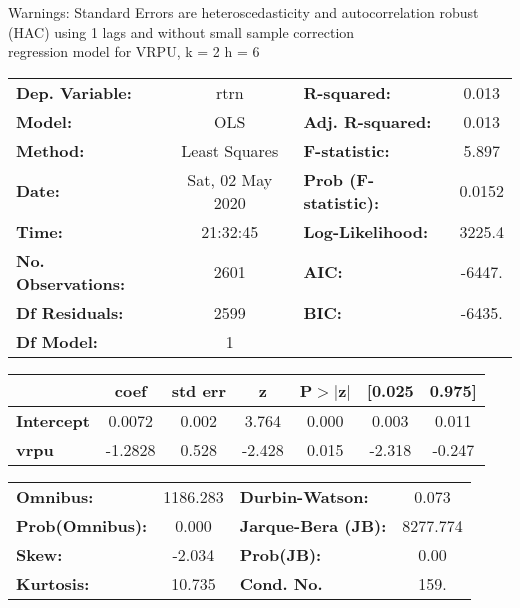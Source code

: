 Warnings: \newline
 [1] Standard Errors are heteroscedasticity and autocorrelation robust (HAC) using 1 lags and without small sample correction\\ 

regression model for VRPU, k = 2 h = 6\begin{center}
\begin{tabular}{lclc}
\toprule
\textbf{Dep. Variable:}    &       rtrn       & \textbf{  R-squared:         } &     0.013   \\
\textbf{Model:}            &       OLS        & \textbf{  Adj. R-squared:    } &     0.013   \\
\textbf{Method:}           &  Least Squares   & \textbf{  F-statistic:       } &     5.897   \\
\textbf{Date:}             & Sat, 02 May 2020 & \textbf{  Prob (F-statistic):} &   0.0152    \\
\textbf{Time:}             &     21:32:45     & \textbf{  Log-Likelihood:    } &    3225.4   \\
\textbf{No. Observations:} &        2601      & \textbf{  AIC:               } &    -6447.   \\
\textbf{Df Residuals:}     &        2599      & \textbf{  BIC:               } &    -6435.   \\
\textbf{Df Model:}         &           1      & \textbf{                     } &             \\
\bottomrule
\end{tabular}
\begin{tabular}{lcccccc}
                   & \textbf{coef} & \textbf{std err} & \textbf{z} & \textbf{P$> |$z$|$} & \textbf{[0.025} & \textbf{0.975]}  \\
\midrule
\textbf{Intercept} &       0.0072  &        0.002     &     3.764  &         0.000        &        0.003    &        0.011     \\
\textbf{vrpu}      &      -1.2828  &        0.528     &    -2.428  &         0.015        &       -2.318    &       -0.247     \\
\bottomrule
\end{tabular}
\begin{tabular}{lclc}
\textbf{Omnibus:}       & 1186.283 & \textbf{  Durbin-Watson:     } &    0.073  \\
\textbf{Prob(Omnibus):} &   0.000  & \textbf{  Jarque-Bera (JB):  } & 8277.774  \\
\textbf{Skew:}          &  -2.034  & \textbf{  Prob(JB):          } &     0.00  \\
\textbf{Kurtosis:}      &  10.735  & \textbf{  Cond. No.          } &     159.  \\
\bottomrule
\end{tabular}
\end{center}

